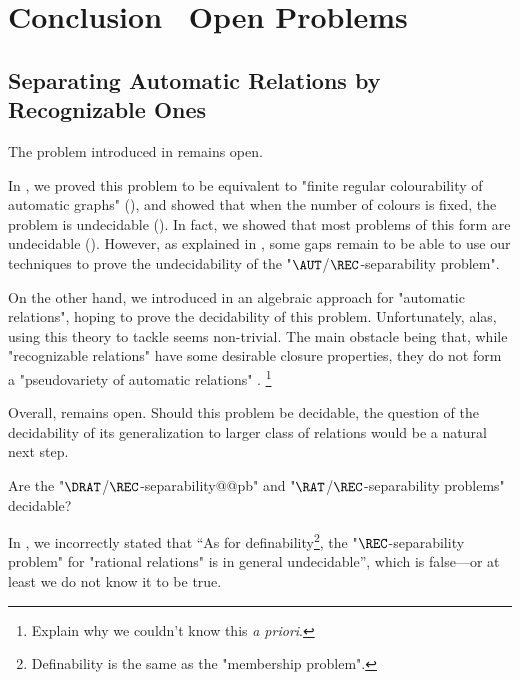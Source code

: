 \chapter{Conclusion \fancyand~Open Problems}
\label{ch:conclu-automatic}

\section{Separating Automatic Relations by Recognizable Ones}

The problem introduced in 
remains open.

\openProblemAutRecSeparability*

In , we proved this problem to be equivalent
to "finite regular colourability of automatic graphs" (),
and showed that when the number of colours is fixed, the problem is undecidable
().
In fact, we showed that most problems of this form are undecidable
().
However, as explained in , some gaps remain to be able to use
our techniques to prove the undecidability of the "$\AUT$/$\REC$-separability problem".

On the other hand, we introduced in  an algebraic approach for
"automatic relations", hoping to prove the decidability of this problem.
Unfortunately, alas, using this theory to tackle 
seems non-trivial. The main obstacle being that, while
"recognizable relations" have some desirable closure properties,
they do not form a "pseudovariety of automatic relations"
.%
\footnote{Explain why we couldn't know this \emph{a priori}.}

Overall,  remains open.
Should this problem be decidable, the question of
the decidability of its generalization to larger class of relations would be
a natural next step.

\begin{openproblem}
	Are the "$\DRAT$/$\REC$-separability@@pb" and
	"$\RAT$/$\REC$-separability problems" decidable?
\end{openproblem}

In \cite[\S~1]{BarceloFigueiraMorvan2023SeparatingAutomatic},
we incorrectly stated that ``As for definability\footnote{Definability is the same
as the "membership problem".}, the "$\REC$-separability problem" for "rational relations" is in general undecidable'', which is false---or at least we do not know it to be true.


